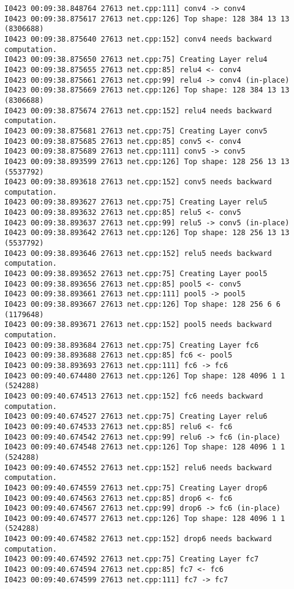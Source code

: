 \documentclass[a4]{article}
\begin{document}
\begin{lstlisting}
I0423 00:09:38.848764 27613 net.cpp:111] conv4 -> conv4
I0423 00:09:38.875617 27613 net.cpp:126] Top shape: 128 384 13 13 (8306688)
I0423 00:09:38.875640 27613 net.cpp:152] conv4 needs backward computation.
I0423 00:09:38.875650 27613 net.cpp:75] Creating Layer relu4
I0423 00:09:38.875655 27613 net.cpp:85] relu4 <- conv4
I0423 00:09:38.875661 27613 net.cpp:99] relu4 -> conv4 (in-place)
I0423 00:09:38.875669 27613 net.cpp:126] Top shape: 128 384 13 13 (8306688)
I0423 00:09:38.875674 27613 net.cpp:152] relu4 needs backward computation.
I0423 00:09:38.875681 27613 net.cpp:75] Creating Layer conv5
I0423 00:09:38.875685 27613 net.cpp:85] conv5 <- conv4
I0423 00:09:38.875689 27613 net.cpp:111] conv5 -> conv5
I0423 00:09:38.893599 27613 net.cpp:126] Top shape: 128 256 13 13 (5537792)
I0423 00:09:38.893618 27613 net.cpp:152] conv5 needs backward computation.
I0423 00:09:38.893627 27613 net.cpp:75] Creating Layer relu5
I0423 00:09:38.893632 27613 net.cpp:85] relu5 <- conv5
I0423 00:09:38.893637 27613 net.cpp:99] relu5 -> conv5 (in-place)
I0423 00:09:38.893642 27613 net.cpp:126] Top shape: 128 256 13 13 (5537792)
I0423 00:09:38.893646 27613 net.cpp:152] relu5 needs backward computation.
I0423 00:09:38.893652 27613 net.cpp:75] Creating Layer pool5
I0423 00:09:38.893656 27613 net.cpp:85] pool5 <- conv5
I0423 00:09:38.893661 27613 net.cpp:111] pool5 -> pool5
I0423 00:09:38.893667 27613 net.cpp:126] Top shape: 128 256 6 6 (1179648)
I0423 00:09:38.893671 27613 net.cpp:152] pool5 needs backward computation.
I0423 00:09:38.893684 27613 net.cpp:75] Creating Layer fc6
I0423 00:09:38.893688 27613 net.cpp:85] fc6 <- pool5
I0423 00:09:38.893693 27613 net.cpp:111] fc6 -> fc6
I0423 00:09:40.674480 27613 net.cpp:126] Top shape: 128 4096 1 1 (524288)
I0423 00:09:40.674513 27613 net.cpp:152] fc6 needs backward computation.
I0423 00:09:40.674527 27613 net.cpp:75] Creating Layer relu6
I0423 00:09:40.674533 27613 net.cpp:85] relu6 <- fc6
I0423 00:09:40.674542 27613 net.cpp:99] relu6 -> fc6 (in-place)
I0423 00:09:40.674548 27613 net.cpp:126] Top shape: 128 4096 1 1 (524288)
I0423 00:09:40.674552 27613 net.cpp:152] relu6 needs backward computation.
I0423 00:09:40.674559 27613 net.cpp:75] Creating Layer drop6
I0423 00:09:40.674563 27613 net.cpp:85] drop6 <- fc6
I0423 00:09:40.674567 27613 net.cpp:99] drop6 -> fc6 (in-place)
I0423 00:09:40.674577 27613 net.cpp:126] Top shape: 128 4096 1 1 (524288)
I0423 00:09:40.674582 27613 net.cpp:152] drop6 needs backward computation.
I0423 00:09:40.674592 27613 net.cpp:75] Creating Layer fc7
I0423 00:09:40.674594 27613 net.cpp:85] fc7 <- fc6
I0423 00:09:40.674599 27613 net.cpp:111] fc7 -> fc7

\end{lstlisting}
\end{document}
